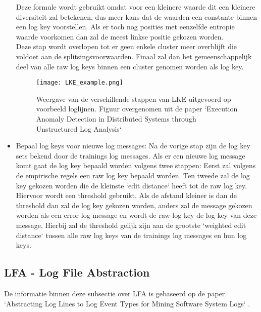 \begin{itemize}
    Deze formule wordt gebruikt omdat voor een kleinere waarde dit een kleinere diversiteit zal betekenen, dus meer kans dat de waarden een constante binnen een log key voorstellen. Als er toch nog posities met eenzelfde entropie waarde voorkomen dan zal de meest linkse positie gekozen worden. \\
    Deze stap wordt overlopen tot er geen enkele cluster meer overblijft die voldoet aan de splitsingsvoorwaarden. Finaal zal dan het gemeenschappelijk deel van alle raw log keys binnen een cluster genomen worden als log key.
    \begin{center}
        \begin{figure}[!htp]
            \texttt{[image: LKE\_example.png]}
            \caption{Weergave van de verschillende stappen van LKE uitgevoerd op voorbeeld loglijnen. Figuur overgenomen uit de paper `Execution Anomaly Detection in Distributed Systems through Unstructured Log Analysis` \autocite{fu2009execution}}
        \end{figure}
    \end{center}
    \item Bepaal log keys voor nieuwe log messages: Na de vorige stap zijn de log key sets bekend door de trainings log messages. Als er een nieuwe log message komt gaat de log key bepaald worden volgens twee stappen: Eerst zal volgens de empirische regels een raw log key bepaald worden. Ten tweede zal de log key gekozen worden die de kleinste `edit distance` heeft tot de raw log key. Hiervoor wordt een threshold gebruikt. Als de afstand kleiner is dan de threshold dan zal de log key gekozen worden, anders zal de message gekozen worden als een error log message en wordt de raw log key de log key van deze message. Hierbij zal de threshold gelijk zijn aan de grootste `weighted edit distance` tussen alle raw log keys van de trainings log messages en hun log keys.
\end{itemize}

\subsection{LFA - Log File Abstraction}
De informatie binnen deze subsectie over LFA is gebaseerd op de paper `Abstracting Log Lines to Log Event Types for Mining Software System Logs` \autocite{nagappan2010abstracting}.

